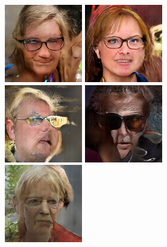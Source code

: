 \begin{figure}[!h]
\begin{subfigure}[b]{\textwidth}
    \end{subfigure}
    \begin{subfigure}[b]{\textwidth}
        \centerline{
            \includegraphics[scale=0.485]{figures/ffhq/forced-glasses-hair-brown/ffhq128x128_glasses_yes_hair_color_brown0000.png}
            \includegraphics[scale=0.485]{figures/ffhq/forced-glasses-hair-brown/ffhq128x128_glasses_yes_hair_color_brown0001.png}
            \includegraphics[scale=0.485]{figures/ffhq/forced-glasses-hair-brown/ffhq128x128_glasses_yes_hair_color_brown0002.png}
            \includegraphics[scale=0.485]{figures/ffhq/forced-glasses-hair-brown/ffhq128x128_glasses_yes_hair_color_brown0003.png}
            \includegraphics[scale=0.485]{figures/ffhq/forced-glasses-hair-brown/ffhq128x128_glasses_yes_hair_color_brown0004.png}
}
\end{subfigure}
\end{figure}
